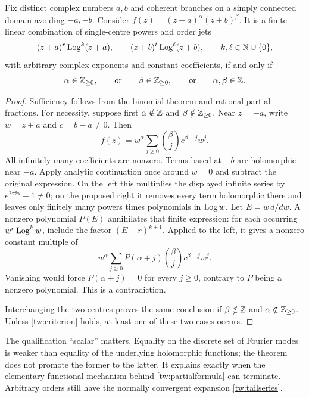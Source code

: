\begin{theorem}
\label{tw:classification}
Fix distinct complex numbers $a,b$ and coherent branches on a simply
connected domain avoiding $-a,-b$. Consider
$f(z)=(z+a)^\alpha(z+b)^\beta$. It is a finite linear combination
of single-centre powers and order jets
\[
 (z+a)^r\operatorname{Log}^k(z+a),\qquad (z+b)^t\operatorname{Log}^\ell(z+b),
 \qquad k,\ell\in\mathbb N\cup\{0\},
\]
with arbitrary complex exponents and constant coefficients, if and only if
\begin{equation}
 \alpha\in\mathbb Z_{\ge0},\qquad\text{or}\qquad
 \beta\in\mathbb Z_{\ge0},\qquad\text{or}\qquad
 \alpha,\beta\in\mathbb Z.
 \label{tw:criterion}
\end{equation}
\end{theorem}

\begin{proof}
Sufficiency follows from the binomial theorem and rational partial
fractions. For necessity, suppose first $\alpha\notin\mathbb Z$ and
$\beta\notin\mathbb Z_{\ge0}$. Near $z=-a$, write $w=z+a$ and
$c=b-a\ne0$. Then
\[
 f(z)=w^\alpha\sum_{j\ge0}\binom\beta j c^{\beta-j}w^j.
\]
All infinitely many coefficients are nonzero. Terms based at $-b$
are holomorphic near $-a$. Apply analytic continuation once around
$w=0$ and subtract the original expression. On the left this
multiplies the displayed infinite series by
$e^{2\pi\ii\alpha}-1\ne0$; on the proposed right it removes every
term holomorphic there and leaves only finitely many powers times
polynomials in $\operatorname{Log} w$. Let $E=w\,d/dw$. A nonzero polynomial $P(E)$ annihilates that
finite expression: for each occurring $w^r\operatorname{Log}^k w$, include the
factor $(E-r)^{k+1}$. Applied to the left, it gives a nonzero constant
multiple of
\[
 w^\alpha\sum_{j\ge0}P(\alpha+j)
                    \binom\beta j c^{\beta-j}w^j.
\]
Vanishing would force $P(\alpha+j)=0$ for every $j\ge0$, contrary
to $P$ being a nonzero polynomial. This is a contradiction.

Interchanging the two centres proves the same conclusion if
$\beta\notin\mathbb Z$ and $\alpha\notin\mathbb Z_{\ge0}$. Unless
\eqref{tw:criterion} holds, at least one of these two cases occurs.
\end{proof}

The qualification ``scalar'' matters. Equality on the discrete set of
Fourier modes is weaker than equality of the underlying holomorphic
functions; the theorem does not promote the former to the latter.
It explains exactly when the elementary functional mechanism behind
\eqref{tw:partialformula} can terminate. Arbitrary orders still have
the normally convergent expansion \eqref{tw:tailseries}.

